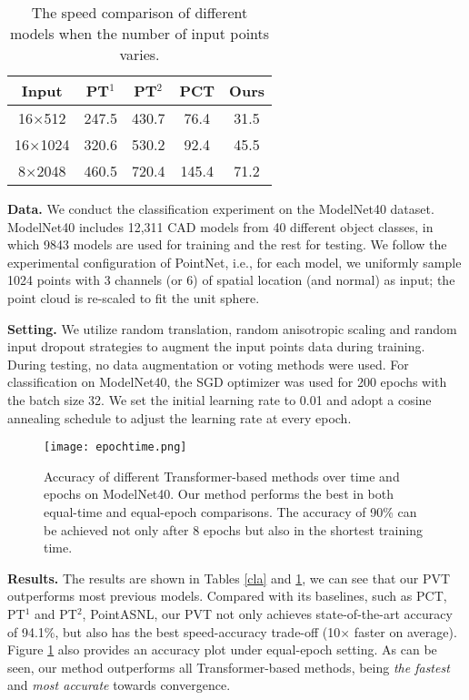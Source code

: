 \documentclass[10pt,twocolumn,letterpaper]{article}
\begin{document}
\begin{table}  
\centering
\begin{center} 
\begin{tabular}{|c|cccc|}   
\hline
Input & PT$^1$ & PT$^2$ & PCT & Ours\\
\hline
16$\times$512 & 247.5 & 430.7 & 76.4 & 31.5  \\
16$\times$1024 & 320.6 & 530.2 &92.4& 45.5\\
8$\times$2048 & 460.5 & 720.4 &145.4& 71.2  \\
\hline
\end{tabular}  
\end{center}  
\caption{The speed comparison of different models when the number of input points varies.} 
\label{speedcompa}
\end{table} 

\textbf{Data. }We conduct the classification experiment on the ModelNet40 \cite{modelnet40} dataset. ModelNet40 includes 12,311 CAD models from 40 different object classes, in which 9843 models are used for training and the rest for testing. We follow the experimental configuration of PointNet, i.e., for each model, we uniformly sample 1024 points with 3 channels (or 6) of spatial location (and normal) as input; the point cloud is re-scaled to fit the unit sphere.

\textbf{Setting.} We utilize random translation, random anisotropic scaling and random input dropout strategies to augment the input points data during training. During testing, no data augmentation or voting methods were used. For classification on ModelNet40, the SGD optimizer was used for 200 epochs with the batch size 32. We set the initial learning rate to 0.01 and adopt a cosine annealing schedule to adjust the learning rate at every epoch.

\begin{figure}
    \centering
     \texttt{[image: epochtime.png]}
    \caption{Accuracy of different Transformer-based
methods over time and epochs on ModelNet40. Our method performs the best in both equal-time and equal-epoch comparisons. The accuracy of 90\% can be achieved not only after 8 epochs but also in the shortest training time.}
    \label{epochandtime}
\end{figure}
\textbf{Results.} The results are shown in Tables \ref{cla} and \ref{speedcompa}, we can see that our PVT outperforms most previous models. Compared with its baselines, such as PCT, PT$^1$ and PT$^2$, PointASNL, our PVT not only achieves state-of-the-art accuracy of 94.1\%, but also has the best speed-accuracy trade-off (10$\times$ faster on average). Figure \ref{epochandtime} also provides an accuracy plot under equal-epoch setting. As can be seen, our method outperforms all Transformer-based methods, being \emph{the fastest} and \emph{most accurate} towards convergence.
\end{document}
